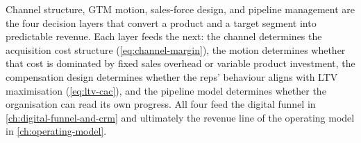 Channel structure, GTM motion, sales-force design, and pipeline management are the four
decision layers that convert a product and a target segment into predictable revenue.
Each layer feeds the next: the channel determines the acquisition cost structure
(\cref{eq:channel-margin}), the motion determines whether that cost is dominated by fixed
sales overhead or variable product investment, the compensation design determines whether
the reps' behaviour aligns with LTV maximisation (\cref{eq:ltv-cac}), and the pipeline
model determines whether the organisation can read its own progress. All four feed the
digital funnel in \cref{ch:digital-funnel-and-crm} and ultimately the revenue line of the
operating model in \cref{ch:operating-model}.
